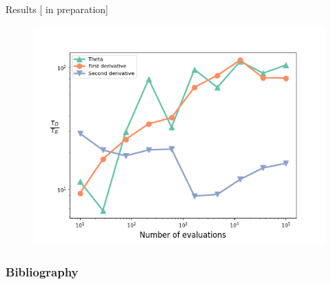 \documentclass[10pt]{beamer}
\begin{document}
\begin{frame}{Results \hfill \small [\cite{new} in preparation]}
    \begin{figure}[t]
            \includegraphics[width=0.8\columnwidth]{figures/theta.png}
            \label{fig:theta}
    \end{figure}
\end{frame}


\begin{frame}
\frametitle{Bibliography}
 \printbibliography
\end{frame}
\end{document}
